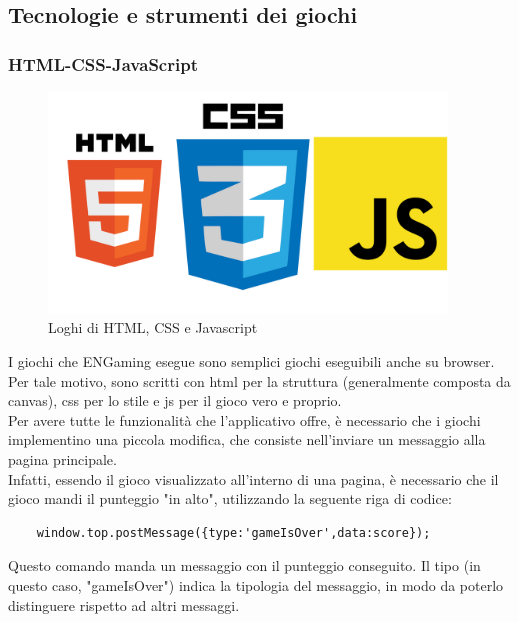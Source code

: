 \subsection{Tecnologie e strumenti dei giochi}

\subsubsection{HTML-CSS-JavaScript}
\begin{figure}[h]
    \centering
    \includegraphics[width=300pt]{images/technologies/HTMLCSSJS.png}
    \caption{Loghi di HTML, CSS e Javascript}
    \label{fig:HTMLCSSJS}
\end{figure}
I giochi che ENGaming esegue sono semplici giochi eseguibili anche su browser. Per tale motivo, sono scritti con \gls{html} per la struttura (generalmente composta da canvas), \gls{css} per lo stile e \gls{js} per il gioco vero e proprio.\\
Per avere tutte le funzionalità che l'applicativo offre, è necessario che i giochi implementino una piccola modifica, che consiste nell'inviare un messaggio alla pagina principale.\\
Infatti, essendo il gioco visualizzato all'interno di una pagina, è necessario che il gioco mandi il punteggio "in alto", utilizzando la seguente riga di codice:
\begin{lstlisting}
    window.top.postMessage({type:'gameIsOver',data:score});
\end{lstlisting}
Questo comando manda un messaggio con il punteggio conseguito. Il tipo (in questo caso, "gameIsOver") indica la tipologia del messaggio, in modo da poterlo distinguere rispetto ad altri messaggi.
\newpage
